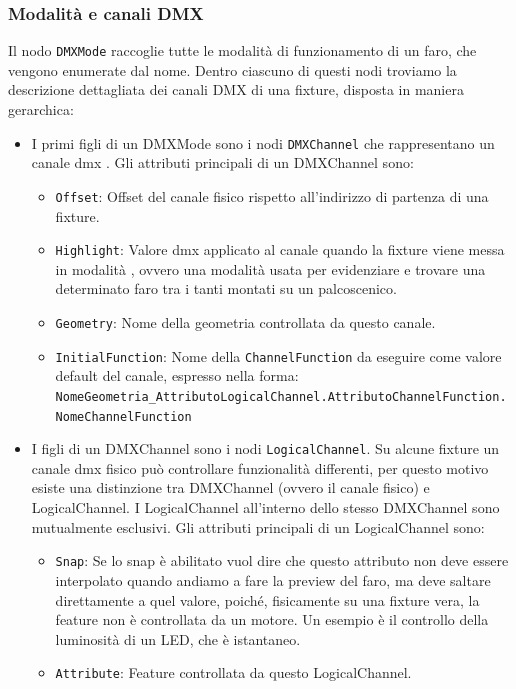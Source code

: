 \documentclass[main.tex]{subfiles}
\begin{document}
\subsubsection{Modalità e canali DMX}\label{subsec:1_2_dmxchannels}
Il nodo \lstinline{DMXMode} raccoglie tutte le modalità di funzionamento di un faro, che vengono enumerate dal nome. Dentro ciascuno di questi nodi troviamo la descrizione dettagliata dei canali DMX di una fixture, disposta in maniera gerarchica:
\begin{itemize}
    \item I primi figli di un DMXMode sono i nodi \lstinline{DMXChannel} che rappresentano un canale dmx . Gli attributi principali di un DMXChannel sono: \begin{itemize}
            \item \lstinline{Offset}: Offset del canale fisico rispetto all'indirizzo di partenza di una fixture.
            \item \lstinline{Highlight}: Valore dmx applicato al canale quando la fixture viene messa in modalità , ovvero una modalità usata per evidenziare e trovare una determinato faro tra i tanti montati su un palcoscenico.
            \item \lstinline{Geometry}: Nome della geometria controllata da questo canale.
            \item \lstinline{InitialFunction}: Nome della \lstinline{ChannelFunction} da eseguire come valore default del canale, espresso nella forma: \lstinline{NomeGeometria_AttributoLogicalChannel.AttributoChannelFunction.NomeChannelFunction}
        \end{itemize}
    \item I figli di un DMXChannel sono i nodi \lstinline{LogicalChannel}. Su alcune fixture un canale dmx fisico può controllare funzionalità differenti, per questo motivo esiste una distinzione tra DMXChannel (ovvero il canale fisico) e LogicalChannel. I LogicalChannel all'interno dello stesso DMXChannel sono mutualmente esclusivi. Gli attributi principali di un LogicalChannel sono: \begin{itemize}
            \item \lstinline{Snap}: Se lo snap è abilitato vuol dire che questo attributo non deve essere interpolato quando andiamo a fare la preview del faro, ma deve saltare direttamente a quel valore, poiché, fisicamente su una fixture vera, la feature non è controllata da un motore. Un esempio è il controllo della luminosità di un LED, che è istantaneo.
            \item \lstinline{Attribute}: Feature controllata da questo LogicalChannel.

\end{itemize}
\end{itemize}
\end{document}
